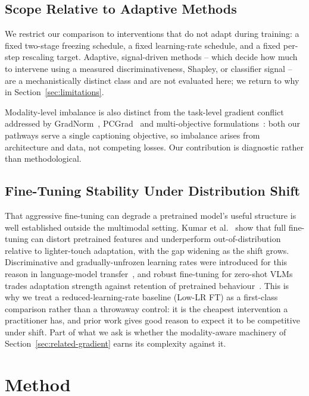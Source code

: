 \documentclass[journal]{IEEEtran}
\begin{document}
\subsection{Scope Relative to Adaptive Methods}
\label{sec:scope-adaptive}
We restrict our comparison to interventions that do not adapt
during training: a fixed two-stage freezing schedule, a fixed
learning-rate schedule, and a fixed per-step rescaling target.
Adaptive, signal-driven methods -- which decide how much to
intervene using a measured discriminativeness, Shapley, or
classifier signal -- are a mechanistically distinct class and are
not evaluated here; we return to why in
Section~\ref{sec:limitations}.

Modality-level imbalance is also distinct from the task-level gradient conflict addressed by GradNorm~\cite{chen2018gradnorm},
PCGrad~\cite{yu2020pcgrad} and multi-objective
formulations~\cite{sener2018mgda}: both our pathways serve a single captioning objective, so imbalance arises from architecture and data, not competing losses. Our contribution is diagnostic rather than methodological.

\subsection{Fine-Tuning Stability Under Distribution Shift}
\label{sec:related-stability}
That aggressive fine-tuning can degrade a pretrained model's useful structure is well established outside the multimodal setting. Kumar et al.~\cite{kumar2022finetuning} show that full fine-tuning can distort pretrained features and underperform out-of-distribution relative to lighter-touch adaptation, with the gap widening as the shift grows. Discriminative and gradually-unfrozen learning rates were introduced for this reason in language-model
transfer~\cite{howard2018ulmfit}, and robust fine-tuning for
zero-shot VLMs trades adaptation strength against retention of
pretrained behaviour~\cite{wortsman2022robustft}. This is why we
treat a reduced-learning-rate baseline (Low-LR FT) as a first-class comparison rather than a throwaway control: it is the cheapest intervention a practitioner has, and prior work gives good reason to expect it to be competitive under shift. Part of what we ask is whether the modality-aware machinery of
Section~\ref{sec:related-gradient} earns its complexity against it.

\section{Method}
\label{sec:method}
\end{document}

